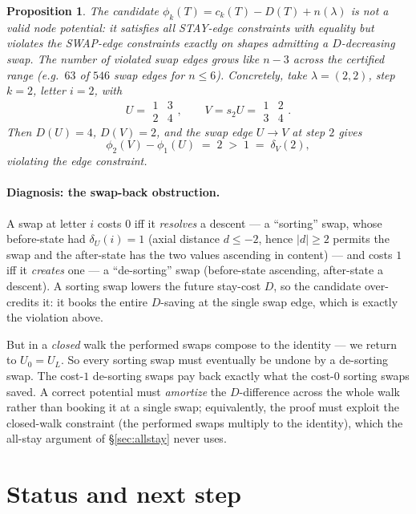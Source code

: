 \documentclass[11pt]{article}
\theoremstyle{plain}
\newtheorem{proposition}{Proposition}
\theoremstyle{remark}
\begin{document}
\begin{proposition}\label{prop:obstruction}
The candidate $\phi_k(T)=c_k(T)-D(T)+n(\lambda)$ is \emph{not} a valid node
potential: it satisfies all STAY-edge constraints with equality but violates
the SWAP-edge constraints exactly on shapes admitting a $D$-decreasing swap.
The number of violated swap edges grows like $n-3$ across the certified
range (e.g.\ $63$ of $546$ swap edges for $n\le 6$). Concretely, take
$\lambda=(2,2)$, step $k=2$, letter $i=2$, with
\[
  U=\begin{smallmatrix}1&3\\2&4\end{smallmatrix},
  \qquad
  V=s_2U=\begin{smallmatrix}1&2\\3&4\end{smallmatrix}.
\]
Then $D(U)=4$, $D(V)=2$, and the swap edge $U\to V$ at step $2$ gives
\[
  \phi_2(V)-\phi_1(U)\;=\;2\;>\;1\;=\;\delta_V(2),
\]
violating the edge constraint.
\end{proposition}

\paragraph{Diagnosis: the swap-back obstruction.}
A swap at letter $i$ costs $0$ iff it \emph{resolves} a descent --- a
``sorting'' swap, whose before-state had $\delta_U(i)=1$ (axial distance
$d\le-2$, hence $|d|\ge2$ permits the swap and the after-state has the two
values ascending in content) --- and costs $1$ iff it \emph{creates} one ---
a ``de-sorting'' swap (before-state ascending, after-state a descent). A
sorting swap lowers the future stay-cost $D$, so the candidate over-credits
it: it books the entire $D$-saving at the single swap edge, which is exactly
the violation above.

But in a \emph{closed} walk the performed swaps compose to the identity ---
we return to $U_0=U_L$. So every sorting swap must eventually be undone by a
de-sorting swap. The cost-$1$ de-sorting swaps pay back exactly what the
cost-$0$ sorting swaps saved. A correct potential must \emph{amortize} the
$D$-difference across the whole walk rather than booking it at a single
swap; equivalently, the proof must exploit the closed-walk constraint (the
performed swaps multiply to the identity), which the all-stay argument of
\S\ref{sec:allstay} never uses.

\section{Status and next step}\label{sec:status}
\end{document}
